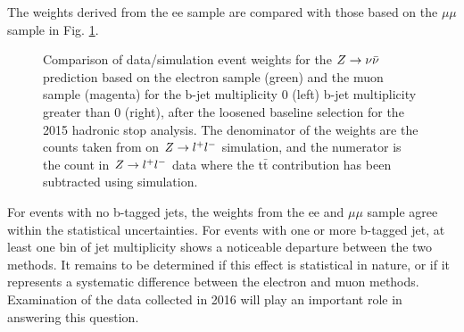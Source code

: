 The weights derived from the ee sample are compared with those based on the $\mu\mu$ sample in Fig. \ref{fig:ZInvWeights}. 
\begin{figure}[tb!]
\centering
{}
\caption{Comparison of data/simulation event weights for the $Z\rightarrow \nu\bar{\nu}$ prediction based on the electron sample (green) and the muon sample (magenta) for the b-jet multiplicity 0 (left) b-jet multiplicity greater than 0 (right), after the loosened baseline selection for the 2015 hadronic stop analysis. The denominator of the weights are the counts taken from on $Z\rightarrow l^+l^-$ simulation, and the numerator is the count in $Z\rightarrow l^+l^-$ data where the t$\bar{\text{t}}$ contribution has been subtracted using simulation. }
\label{fig:ZInvWeights}
\end{figure}
For events with no b-tagged jets, the weights from the ee and $\mu\mu$ sample agree within the statistical uncertainties. For events with one or more b-tagged jet, at least one bin of jet multiplicity shows a noticeable departure between the two methods. It remains to be determined if this effect is statistical in nature, or if it represents a systematic difference between the electron and muon methods. Examination of the data collected in 2016 will play an important role in answering this question.

